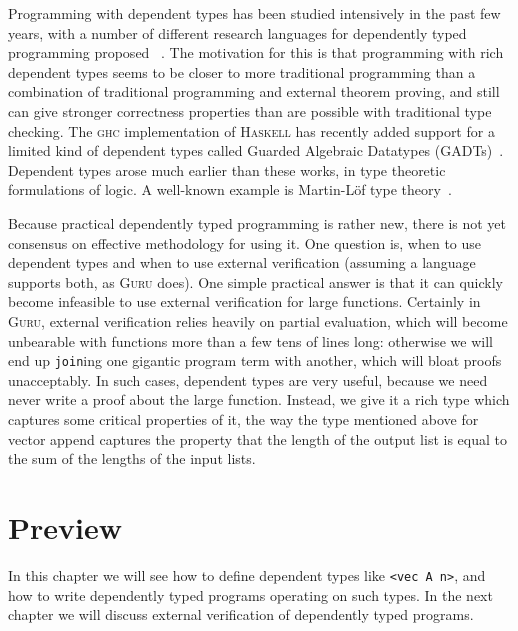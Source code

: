 \documentclass{book}[12pt]
\newcommand{\guru}[0]{\textsc{Guru}\xspace}
\begin{document}
Programming with dependent types has been studied intensively in the
past few years, with a number of different research languages for
dependently typed programming proposed
~\cite{nanevski+08,norell07,pasalic+07,sheard06,licata+05,chenxi05,wsw-icfp05,mcbride+04}.
The motivation for this is that programming with rich dependent types
seems to be closer to more traditional programming than a combination
of traditional programming and external theorem proving, and still can
give stronger correctness properties than are possible with
traditional type checking.  The \textsc{ghc} implementation of
\textsc{Haskell} has recently added support for a limited kind of
dependent types called Guarded Algebraic Datatypes
(GADTs)~\cite{Jones+06}.  Dependent types arose much earlier than
these works, in type theoretic formulations of logic.  A well-known
example is Martin-L\"of type theory~\cite{ml84}.

Because practical dependently typed programming is rather new, there
is not yet consensus on effective methodology for using it.  One
question is, when to use dependent types and when to use external
verification (assuming a language supports both, as \guru does).  One
simple practical answer is that it can quickly become infeasible to
use external verification for large functions.  Certainly in \guru,
external verification relies heavily on partial evaluation, which will
become unbearable with functions more than a few tens of lines long:
otherwise we will end up \texttt{join}ing one gigantic program term
with another, which will bloat proofs unacceptably.  In such cases,
dependent types are very useful, because we need never write a proof
about the large function.  Instead, we give it a rich type which
captures some critical properties of it, the way the type mentioned
above for vector append captures the property that the length of the
output list is equal to the sum of the lengths of the input lists.

\section{Preview}

In this chapter we will see how to define dependent types like
\texttt{<vec A n>}, and how to write dependently typed programs
operating on such types.  In the next chapter we will discuss external
verification of dependently typed programs.
\end{document}
